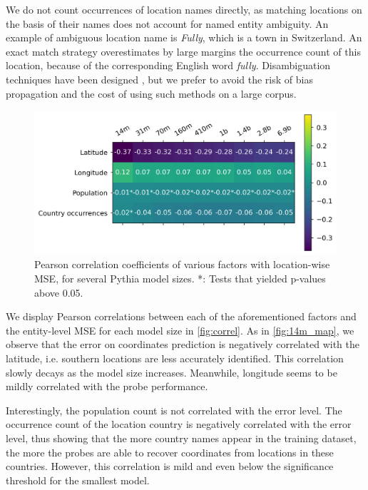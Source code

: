 We do not count occurrences of location names directly, as matching locations on the basis of their names does not account for named entity ambiguity. An example of ambiguous location name is \textit{Fully}, which is a town in Switzerland. An exact match strategy overestimates by large margins the occurrence count of this location, because of the corresponding English word \textit{fully}. Disambiguation techniques have been designed \citep{hoffart-etal-2011-robust, orr2020bootleg}, but we prefer to avoid the risk of bias propagation and the cost of using such methods on a large corpus.

\begin{figure}
    \centering
    \includegraphics[width=0.9\linewidth]{sources/part_1/geographical/imgs/correl_size.png}
    \caption{Pearson correlation coefficients of various factors with location-wise MSE, for several Pythia model sizes. *: Tests that yielded p-values above 0.05.}
    \label{fig:correl}
\end{figure}

We display Pearson correlations between each of the aforementioned factors and the entity-level MSE for each model size in \autoref{fig:correl}. As in \autoref{fig:14m_map}, we observe that the error on coordinates prediction is negatively correlated with the latitude, i.e. southern locations are less accurately identified. This correlation slowly decays as the model size increases. Meanwhile, longitude seems to be mildly correlated with the probe performance.

Interestingly, the population count is not correlated with the error level. The occurrence count of the location country is negatively correlated with the error level, thus showing that the more country names appear in the training dataset, the more the probes are able to recover coordinates from locations in these countries. However, this correlation is mild and even below the significance threshold for the smallest model.

